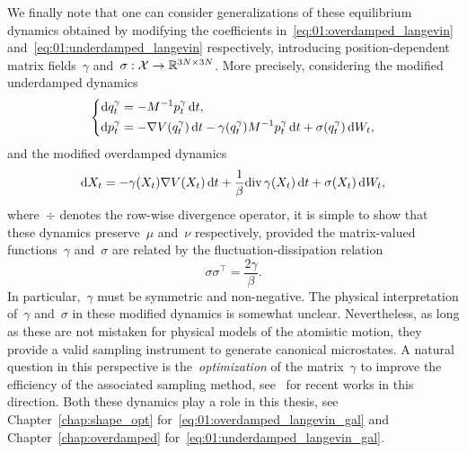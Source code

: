 We finally note that one can consider generalizations of these equilibrium dynamics obtained by modifying the coefficients in~\eqref{eq:01:overdamped_langevin} and~\eqref{eq:01:underdamped_langevin} respectively, introducing position-dependent matrix fields~$\gamma$ and~$\sigma:\mathcal{X}\to \mathbb{R}^{3N\times 3N}$.
More precisely, considering the modified underdamped dynamics
\begin{equation}
    \label{eq:01:underdamped_langevin_gal}
    \left\{\begin{aligned}
        \mathrm{d} q_t^\gamma &= -M^{-1}p_t^\gamma\,\mathrm{d} t,\\
        \mathrm{d} p_t^\gamma &= -\nabla V(q_t^\gamma)\,\mathrm{d} t - \gamma(q_t^\gamma)M^{-1}p_t^\gamma\,\mathrm{d} t + \sigma(q_t^\gamma)\,\mathrm{d} W_t,
    \end{aligned}\right.
\end{equation}
and the modified overdamped dynamics
\begin{equation}
    \label{eq:01:overdamped_langevin_gal}
    \mathrm{d} X_t = - \gamma(X_t)\nabla V(X_t)\,\mathrm{d} t + \frac1\beta \mathrm{div}\,\gamma(X_t)\,\mathrm{d} t + \sigma(X_t)\,\mathrm{d} W_t,
\end{equation}
where~$\div$ denotes the row-wise divergence operator, it is simple to show that these dynamics preserve~$\mu$ and~$\nu$ respectively, provided the matrix-valued functions~$\gamma$ and~$\sigma$ are related by the fluctuation-dissipation relation
\begin{equation}
    \label{eq:01:fd_relation}
    \sigma\sigma^\top = \frac{2\gamma}{\beta}.
\end{equation}
In particular,~$\gamma$ must be symmetric and non-negative. The physical interpretation of~$\gamma$ and~$\sigma$ in these modified dynamics is somewhat unclear.
Nevertheless, as long as these are not mistaken for physical models of the atomistic motion, they provide a valid sampling instrument to generate canonical microstates.
A natural question in this perspective is the~\textit{optimization} of the matrix~$\gamma$ to improve the efficiency of the associated sampling method, see~\cite{CKLTP23,CTZ24,LPRSS24,LSS24} for recent works in this direction.
Both these dynamics play a role in this thesis, see Chapter~\ref{chap:shape_opt} for~\eqref{eq:01:overdamped_langevin_gal} and Chapter~\ref{chap:overdamped} for~\eqref{eq:01:underdamped_langevin_gal}.

